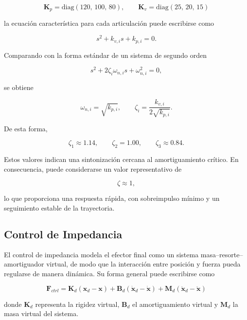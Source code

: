 \documentclass[journal,10pt,twoside]{IEEEtran}
\begin{document}
\begin{enumerate}[label=(\alph*)]
\[
\bm{K}_p = \mathrm{diag}(120,\,100,\,80),
\qquad
\bm{K}_v = \mathrm{diag}(25,\,20,\,15)
\]

la ecuación característica para cada articulación
puede escribirse como

\[
s^2 + k_{v,i}s + k_{p,i} = 0.
\]

Comparando con la forma estándar de un sistema de
segundo orden

\[
s^2 + 2\zeta_i\omega_{n,i}s + \omega_{n,i}^2 = 0,
\]

se obtiene

\[
\omega_{n,i} = \sqrt{k_{p,i}},
\qquad
\zeta_i = \frac{k_{v,i}}{2\sqrt{k_{p,i}}}.
\]

De esta forma,

\[
\zeta_1 \approx 1.14,
\qquad
\zeta_2 = 1.00,
\qquad
\zeta_3 \approx 0.84.
\]

Estos valores indican una sintonización cercana al
amortiguamiento crítico. En consecuencia,
puede considerarse un valor representativo de

\[
\zeta \approx 1,
\]

lo que proporciona una respuesta rápida,
con sobreimpulso mínimo y un seguimiento
estable de la trayectoria.

\end{enumerate}

\subsection{Control de Impedancia}

El control de impedancia modela el efector final como un sistema
masa--resorte--amortiguador virtual, de modo que la interacción
entre posición y fuerza pueda regularse de manera dinámica. Su
forma general puede escribirse como

\begin{equation}
\bm{F}_{ctrl}
=
\bm{K}_d(\bm{x}_d-\bm{x})
+
\bm{B}_d(\dot{\bm{x}}_d-\dot{\bm{x}})
+
\bm{M}_d(\ddot{\bm{x}}_d-\ddot{\bm{x}})
\label{eq:impedance}
\end{equation}

donde $\bm{K}_d$ representa la rigidez virtual, $\bm{B}_d$ el
amortiguamiento virtual y $\bm{M}_d$ la masa virtual del sistema.

\vspace{5mm}
\end{document}
